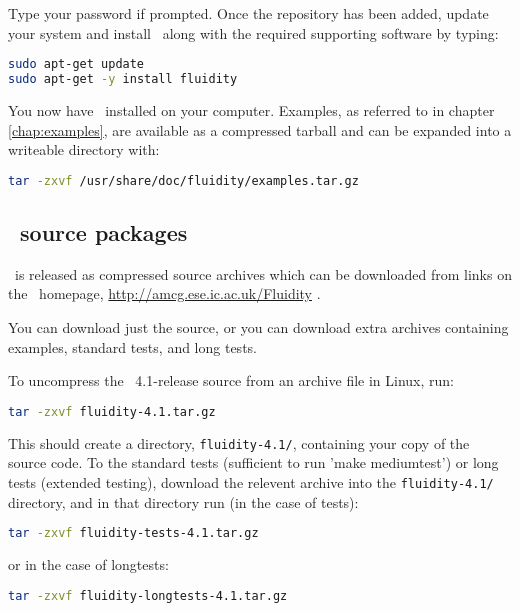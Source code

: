 Type your password if prompted. Once the repository has been added, update your
system and install \fluidity\ along with the required supporting software by
typing:

\begin{lstlisting}[language=Bash]
sudo apt-get update
sudo apt-get -y install fluidity
\end{lstlisting}

You now have \fluidity\ installed on your computer. Examples, as referred to in
chapter \ref{chap:examples}, are available as a compressed tarball and can be
expanded into a writeable directory with:

\begin{lstlisting}[language=Bash]
tar -zxvf /usr/share/doc/fluidity/examples.tar.gz
\end{lstlisting}

\subsection{\fluidity\ source packages}

\fluidity\ is released as compressed source archives which can be downloaded
from links on the \fluidity\ homepage,
\href{http://amcg.ese.ic.ac.uk/Fluidity}{http://amcg.ese.ic.ac.uk/Fluidity} .

You can download just the source, or you can download extra archives containing
examples, standard tests, and long tests.

To uncompress the \fluidity\ 4.1-release source from an archive file in Linux,
run:

\begin{lstlisting}[language=Bash]
tar -zxvf fluidity-4.1.tar.gz
\end{lstlisting}

This should create a directory, \lstinline[language=Bash]+fluidity-4.1/+,
containing your copy of the source code. To the standard tests (sufficient to
run 'make mediumtest') or long tests (extended testing), download the relevent
archive into the \lstinline[language=Bash]+fluidity-4.1/+ directory, and in
that directory run (in the case of tests):

\begin{lstlisting}[language=Bash]
tar -zxvf fluidity-tests-4.1.tar.gz
\end{lstlisting}

or in the case of longtests:

\begin{lstlisting}[language=Bash]
tar -zxvf fluidity-longtests-4.1.tar.gz
\end{lstlisting}

